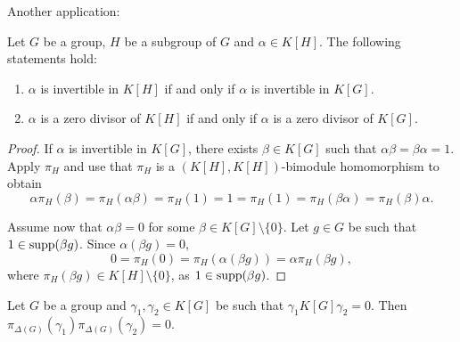 Another application:

\begin{proposition}
	Let $G$ be a group, $H$ be a subgroup of $G$ and $\alpha\in K[H]$. The following statements hold:
	\begin{enumerate}
		\item $\alpha$ is invertible in $K[H]$ if and only if $\alpha$ is
			invertible in $K[G]$.
		\item $\alpha$ is a zero divisor of $K[H]$ if and only if $\alpha$ is  
			a zero divisor of $K[G]$.
	\end{enumerate}
\end{proposition}

\begin{proof}
	If $\alpha$ is invertible in $K[G]$, there exists $\beta\in K[G]$ such that 
	$\alpha\beta=\beta\alpha=1$. Apply $\pi_H$ and use that $\pi_H$ 
	is a $(K[H],K[H])$-bimodule homomorphism to obtain  
	\[
		\alpha\pi_H(\beta)=\pi_H(\alpha\beta)=\pi_H(1)=1=\pi_H(1)=\pi_H(\beta\alpha)=\pi_H(\beta)\alpha.
	\]
	
	Assume now that $\alpha\beta=0$ for some $\beta\in K[G]\setminus\{0\}$. Let $g\in G$
	be such that $1\in\operatorname{supp}(\beta g)$. Since $\alpha(\beta g)=0$, 
	\[
		0=\pi_H(0)=\pi_H(\alpha(\beta g))=\alpha\pi_H(\beta g),
	\]
	where $\pi_H(\beta g)\in K[H]\setminus\{0\}$, as $1\in\operatorname{supp}(\beta g)$. 
\end{proof}

\begin{lemma}[Passman]
	\label{lem:Passman}
	Let $G$ be a group and 
	$\gamma_1,\gamma_2\in K[G]$ be such that $\gamma_1K[G]\gamma_2=0$.
	Then $\pi_{\Delta(G)}(\gamma_1)\pi_{\Delta(G)}(\gamma_2)=0$.
\end{lemma}

